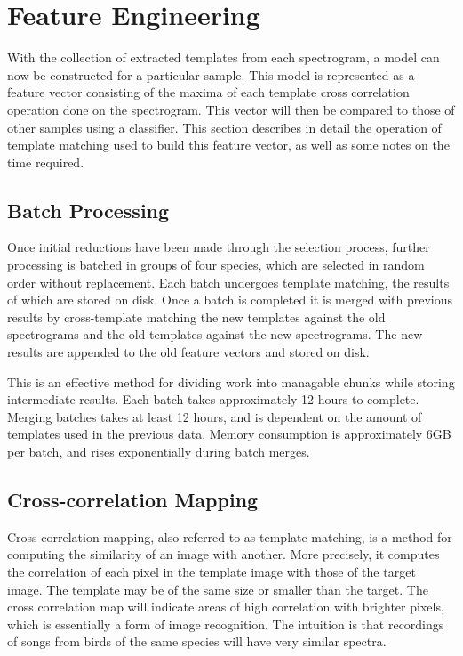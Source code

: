 \section{Feature Engineering}\label{sec:ccm}
With the collection of extracted templates from each spectrogram,
a model can now be constructed for a particular sample.
This model is represented as a feature vector consisting of the maxima
of each template cross correlation operation done on the spectrogram.
This vector will then be compared to those of other samples using a
classifier.
This section describes in detail the operation of template matching
used to build this feature vector, as well as some notes on the time required.

\subsection{Batch Processing}
Once initial reductions have been made through the selection process,
further processing is batched in groups of four species, which are selected in
random order without replacement.
Each batch undergoes template matching, the results of which are stored on disk.
Once a batch is completed it is merged with previous results by cross-template
matching the new templates against the old spectrograms and the old templates
against the new spectrograms.
The new results are appended to the old feature vectors and stored on disk.

This is an effective method for dividing work into managable chunks while storing
intermediate results.
Each batch takes approximately 12 hours to complete.
Merging batches takes at least 12 hours, and is dependent on the amount of
templates used in the previous data.
Memory consumption is approximately 6GB per batch, and rises exponentially
during batch merges.

\subsection{Cross-correlation Mapping}
Cross-correlation mapping, also referred to as template matching, is
a method for computing the similarity of an image with another.
More precisely, it computes the correlation of each pixel in the template image
with those of the target image.
The template may be of the same size or smaller than the target.
The cross correlation map will indicate areas of high correlation with brighter
pixels, which is essentially a form of image recognition.
The intuition is that recordings of songs from birds of the same species will
have very similar spectra.

